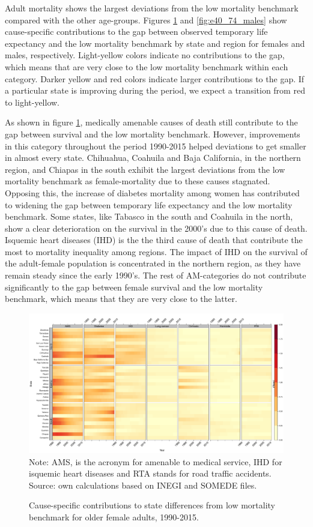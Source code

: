 \documentclass[11.5pt]{article}
\begin{document}
\begin{spacing}{1.5}
Adult mortality shows the largest deviations from the low mortality benchmark compared with the other age-groups. Figures  \ref{fig:e40_74_females} and \ref{fig:e40_74_males} show cause-specific contributions to the gap between observed temporary life expectancy and the low mortality benchmark by state and region for females and males, respectively. Light-yellow colors indicate no contributions to the gap, which means that are very close to the low mortality benchmark within each category. Darker yellow and red colors indicate larger contributions to the gap. If a particular state is improving during the period, we expect a transition from red to light-yellow. 

As shown in figure \ref{fig:e40_74_females}, medically amenable causes of death still contribute to the gap between survival and the low mortality benchmark. However, improvements in this category throughout the period 1990-2015 helped deviations to get smaller in almost every state. Chihuahua, Coahuila and Baja California, in the northern region, and Chiapas in the south exhibit the largest deviations from the low mortality benchmark as female-mortality due to these causes stagnated. Opposing this, the increase of diabetes mortality among women has contributed to widening the gap between temporary life expectancy and the low mortality benchmark. Some states, like Tabasco in the south and Coahuila in the north, show a clear deterioration on the survival in the 2000's due to this cause of death. Isquemic heart diseases (IHD) is the the third cause of death that contribute the most to mortality inequality among regions. The impact of IHD on the survival of the adult-female population is concentrated in the northern region, as they have remain steady since the early 1990's. The rest of AM-categories do not contribute significantly to the gap between female survival and the low mortality benchmark, which means that they are very close to the latter.

\begin{figure}[h]
\centering
\caption{Cause-specific contributions to state differences from low mortality benchmark for older female adults, 1990-2015.}
\label{fig:e40_74_females}
\includegraphics[scale=.33]{Figures/Adult_Female_heatmap.pdf}
Note: AMS, is the acronym for amenable to medical service, IHD for isquemic heart diseases and RTA stands for road traffic accidents. Source: own calculations based on INEGI and SOMEDE files. \end{figure}


\end{spacing}
\end{document}
